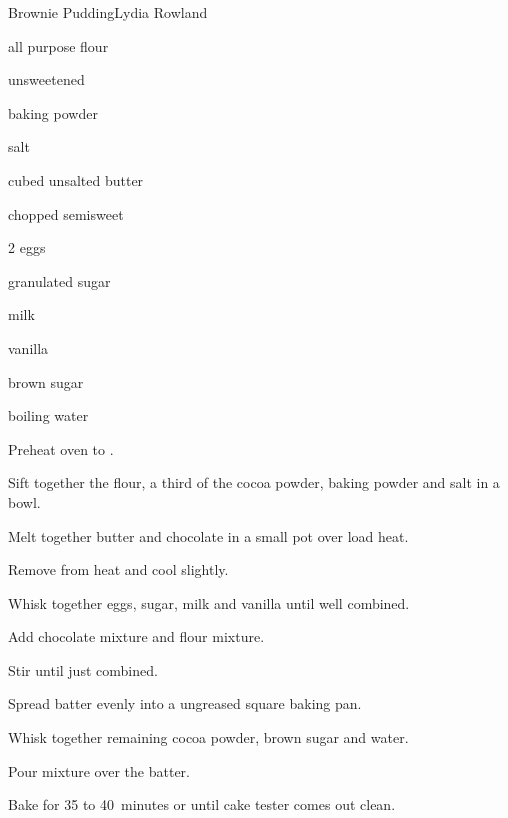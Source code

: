 \begin{recipe}{Brownie Pudding}{Lydia Rowland}{}

\begin{ingredients}
\item {} all purpose flour
\item \C{\twothird} unsweetened 
\item {} baking powder
\item \tp{\half} salt
\item {} cubed unsalted butter
\item \C{\half} chopped semisweet 
\item 2 eggs
\item {} granulated sugar
\item \C{\half} milk
\item {} vanilla
\item \C{\half} brown sugar
\item \C{1\third} boiling water
\end{ingredients}

\begin{directions}
\item Preheat oven to .
\item Sift together the flour, a third of the cocoa powder, baking powder and salt in a bowl.
\item Melt together butter and chocolate in a small pot over load heat.
\item Remove from heat and cool slightly.
\item Whisk together eggs, sugar, milk and vanilla until well combined.
\item Add chocolate mixture and flour mixture.
\item Stir until just combined.
\item Spread batter evenly into a ungreased  square baking pan.
\item Whisk together remaining cocoa powder, brown sugar and water.
\item Pour mixture over the batter.
\item Bake for 35 to 40~minutes or until cake tester comes out clean.
\end{directions}

\end{recipe}
